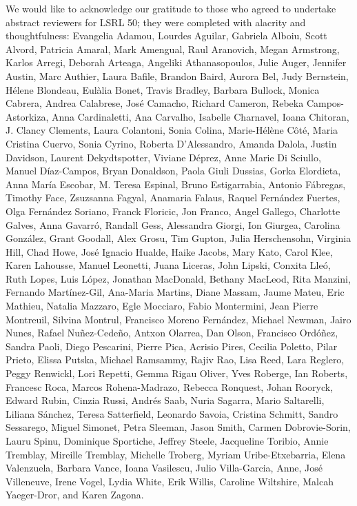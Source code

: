 \documentclass[output=paper,draftmode]{langscibook}
\begin{document}
We would like to acknowledge our gratitude to those who agreed to undertake abstract reviewers for LSRL 50; they were completed with alacrity and thoughtfulness: Evangelia Adamou, Lourdes Aguilar, Gabriela Alboiu, Scott Alvord, Patricia Amaral, Mark Amengual, Raul Aranovich, Megan Armstrong, Karlos Arregi, Deborah Arteaga, Angeliki Athanasopoulos, Julie Auger, Jennifer Austin, Marc Authier, Laura Bafile, Brandon Baird, Aurora Bel, Judy Bernstein, Hélene Blondeau, Eul\`alia Bonet, Travis Bradley, Barbara Bullock, Monica Cabrera, Andrea Calabrese, José Camacho, Richard Cameron, Rebeka Campos-Astorkiza, An\-na Cardinaletti, Ana Carvalho, Isabelle Charnavel, Ioana Chitoran, J. Clancy Clements, Laura Colantoni, Sonia Colina, Marie-Hélène C\^oté, Maria Cristina Cuervo, Sonia Cyrino, Roberta D'Alessandro, Amanda Dalola, Justin Davidson, Laurent Dekydtspotter, Viviane Déprez, Anne Marie Di Sciullo, Manuel Díaz-Campos, Bryan Donaldson, Paola Giuli Dussias, Gorka Elordieta, Anna María Escobar, M. Teresa Espinal, Bruno Estigarrabia, Antonio Fábregas, Timothy Face, Zsuzsanna Fagyal, Anamaria Falaus, Raquel Fernández Fuertes, Olga Fernández Soriano, Franck Floricic, Jon Franco, Angel Gallego, Charlotte Galves, Anna Gavarró, Randall Gess, Alessandra Giorgi, Ion Giurgea, Carolina González, Grant Goodall, Alex Grosu, Tim Gupton, Julia Herschensohn, Virginia Hill, Chad Howe, José Ignacio Hualde, Haike Jacobs, Mary Kato, Carol Klee, Karen Lahousse, Manuel Leonetti, Juana Liceras, John Lipski, Conxita Lleó, Ruth Lopes, Luis López, Jonathan MacDonald, Bethany MacLeod, Rita Manzini, Fernando Martínez-Gil, Ana-Maria Martins, Diane Massam, Jaume Mateu, Eric Mathieu, Natalia Mazzaro, Egle Mocciaro, Fabio Montermini, Jean Pierre Montreuil, Silvina Montrul, Francisco Moreno Fernández, Michael Newman, Jairo Nunes, Rafael Nu\~nez-Cede\~no, Antxon Olarrea, Dan Olson, Francisco Ordó\~nez, Sandra Paoli, Diego Pescarini, Pierre Pica, Acrisio Pires, Cecilia Poletto, Pilar Prieto, Elissa Putska, Michael Ramsammy, Rajiv Rao, Lisa Reed, Lara Reglero, Peggy Renwickl, Lori Repetti, Gemma Rigau Oliver, Yves Roberge, Ian Roberts, Francesc Roca, Marcos Rohena-Madrazo, Rebecca Ronquest, Johan Rooryck, Edward Rubin, Cinzia Russi, Andrés Saab, Nuria  Sagarra, Mario Saltarelli, Liliana Sánchez, Teresa Satterfield, Leonardo Savoia, Cristina Schmitt, Sandro Sessarego, Miguel Simonet, Petra Sleeman, Jason Smith, Carmen Dobrovie-Sorin, Lauru Spinu, Dominique Sportiche, Jeffrey Steele, Jacqueline Toribio, Annie Tremblay, Mireille Tremblay, Michelle Troberg, Myriam Uribe-Etxebarria, Elena Valenzuela, Barbara Vance, Ioana Vasilescu, Julio Villa-Garcia, Anne, José Villeneuve, Irene Vogel, Lydia White, Erik Willis, Caroline Wiltshire, Malcah Yaeger-Dror, and Karen Zagona.
\end{document}
